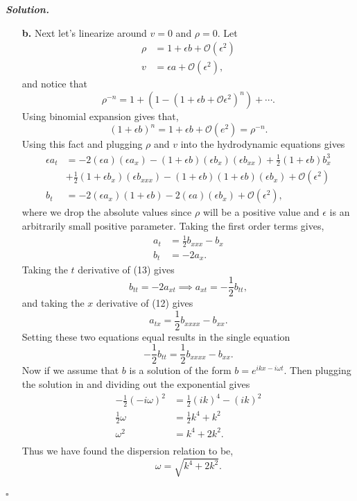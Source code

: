 \documentclass[12pt]{report}
\newenvironment{solution}[1][\it{Solution}]{\textbf{#1. } }{$\square$}
\def\eps{{\epsilon}}
\def\O{{\mathcal{O}}}
\newcommand{\paren}[1]{{\left(#1\right)}} %
\begin{document}
\begin{solution}
\begin{enumerate}
        \item[{\bf b.}]
        Next let's linearize around $v = 0$ and $\rho = 0$. Let
        \begin{align*}
            \rho &= 1 + \eps b + \O(\eps^2)\\
            v &= \eps a + \O(\eps^2),
        \end{align*}
        and notice that
        \[
            \rho^{-n} = 1 +\paren{1 - \paren{1 + \eps b + \O{\eps^2}}^n} + \cdots.
        \]
        Using binomial expansion gives that,
        \[
            (1 + \eps b)^n = 1 + \eps b + \O(e^2) = \rho^{-n}.
        \]
        Using this fact and plugging $\rho$ and $v$ into the hydrodynamic equations gives
        \begin{align*}
            \eps a_t &= -2(\eps a)(\eps a_x) - (1 + \eps b)(\eps b_x)(\eps b_{xx}) + \frac{1}{2}(1 + \eps b)b_x^3\\ 
            &+ \frac{1}{2}(1 + \eps b_x)(\eps b_{xxx}) - (1+ \eps b)(1+ \eps b)(\eps b_x)+\O(\eps^2)\\
            b_t &= -2(\eps a_x)(1 + \eps b)-2(\eps a)(\eps b_x) + \O(\eps^2),
        \end{align*}
        where we drop the absolute values since $\rho$ will be a positive value and $\eps$ is an arbitrarily small positive parameter. Taking the first order terms gives,
        \begin{align}
            a_t &= \frac{1}{2}b_{xxx} - b_x\\
            b_t &= -2a_x.
        \end{align}
        Taking the $t$ derivative of (13) gives
        \[
            b_{tt} = -2a_{xt} \implies a_{xt} = -\frac{1}{2}b_{tt},
        \]
        and taking the $x$ derivative of (12) gives
        \[
            a_{tx} = \frac{1}{2}b_{xxxx} - b_{xx}.
        \]
        Setting these two equations equal results in the single equation
        \[
            -\frac{1}{2}b_{tt} = \frac{1}{2}b_{xxxx} - b_{xx}.
        \]
        Now if we assume that $b$ is a solution of the form $b = e^{ikx - i\omega t}$. Then plugging the solution in and dividing out the exponential gives
        \begin{align*}
            -\frac{1}{2}(-i\omega)^2 &= \frac{1}{2}(ik)^4 - (ik)^2\\
            \frac{1}{2}\omega &= \frac{1}{2}k^4 + k^2\\
            \omega^2 &= k^4 + 2k^2.\\
        \end{align*}
        Thus we have found the dispersion relation to be,
        \[
            \omega = \sqrt{k^4 + 2k^2}.
        \]


\end{enumerate}
\end{solution}
\end{document}
